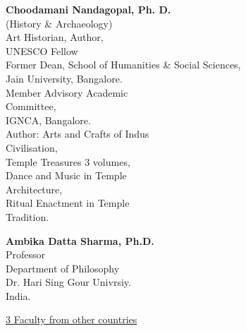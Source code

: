 \begin{multicols}{2}
\begin{trivlist}
\item\textbf{Choodamani Nandagopal, Ph. D.}\\ 
(History \& Archaeology)\\[2pt]
Art Historian, Author,\\[2pt]
UNESCO Fellow\\[2pt]
Former Dean, School of Humanities \& Social Sciences,\\ 
Jain University, Bangalore.\\[2pt]
Member Advisory Academic\\ Committee,\\ 
IGNCA, Bangalore.\\[2pt]
Author: Arts and Crafts of Indus\\ Civilisation,\\ 
Temple Treasures 3 volumes,\\[2pt]
Dance and Music in Temple\\ Architecture,\\ 
Ritual Enactment in Temple\\ Tradition.
 

\item \textbf{Ambika Datta Sharma, Ph.D.}\\ 
Professor\\ 
Department of Philosophy\\
Dr. Hari Sing Gour Univrsiy.\\ 
India.
\end{trivlist}
\end{multicols}
\newpage

\centerline{\underline{3 Faculty from other countries}}
\medskip

